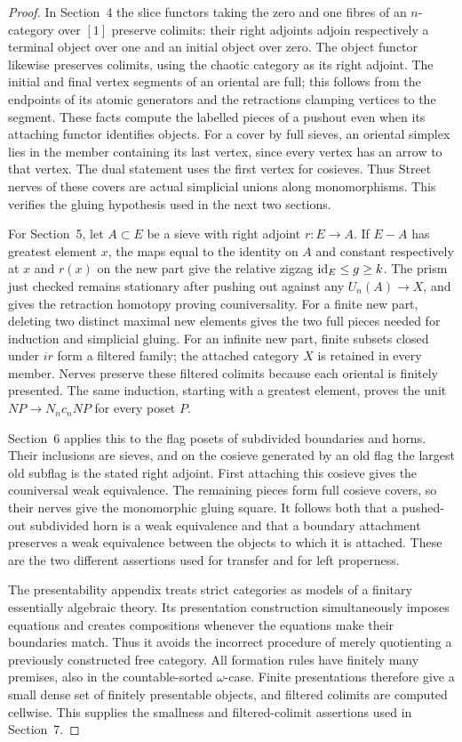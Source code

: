 \begin{proof}
In Section~4 the slice functors taking the zero and one fibres of
an $n$-category over $[1]$ preserve colimits: their right adjoints
adjoin respectively a terminal object over one and an initial
object over zero. The object functor likewise preserves colimits,
using the chaotic category as its right adjoint. The initial and
final vertex segments of an oriental are full; this follows from
the endpoints of its atomic generators and the retractions clamping
vertices to the segment. These facts compute the labelled pieces
of a pushout even when its attaching functor identifies objects.
For a cover by full sieves, an oriental simplex lies in the member
containing its last vertex, since every vertex has an arrow to that
vertex. The dual statement uses the first vertex for cosieves.
Thus Street nerves of these covers are actual simplicial unions
along monomorphisms. This verifies the gluing hypothesis used in
the next two sections.

For Section~5, let $A\subset E$ be a sieve with right adjoint
$r:E\to A$. If $E-A$ has greatest element $x$, the maps equal to
the identity on $A$ and constant respectively at $x$ and $r(x)$
on the new part give the relative zigzag
$\mathrm{id}_E\leq g\geq k$. The prism just checked remains stationary
after pushing out against any $U_n(A)\to X$, and gives the
retraction homotopy proving couniversality. For a finite new part,
deleting two distinct maximal new elements gives the two full
pieces needed for induction and simplicial gluing. For an infinite
new part, finite subsets closed under $ir$ form a filtered family;
the attached category $X$ is retained in every member. Nerves
preserve these filtered colimits because each oriental is finitely
presented. The same induction, starting with a greatest element,
proves the unit $NP\to N_n c_nNP$ for every poset $P$.

Section~6 applies this to the flag posets of subdivided boundaries
and horns. Their inclusions are sieves, and on the cosieve generated
by an old flag the largest old subflag is the stated right adjoint.
First attaching this cosieve gives the couniversal weak equivalence.
The remaining pieces form full cosieve covers, so their nerves
give the monomorphic gluing square. It follows both that a pushed-out
subdivided horn is a weak equivalence and that a boundary attachment
preserves a weak equivalence between the objects to which it is
attached. These are the two different assertions used for transfer
and for left properness.

The presentability appendix treats strict categories as models of a
finitary essentially algebraic theory. Its presentation construction
simultaneously imposes equations and creates compositions whenever
the equations make their boundaries match. Thus it avoids the
incorrect procedure of merely quotienting a previously constructed
free category. All formation rules have finitely many premises,
also in the countable-sorted $\omega$-case. Finite presentations
therefore give a small dense set of finitely presentable objects,
and filtered colimits are computed cellwise. This supplies the
smallness and filtered-colimit assertions used in Section~7.


\end{proof}
